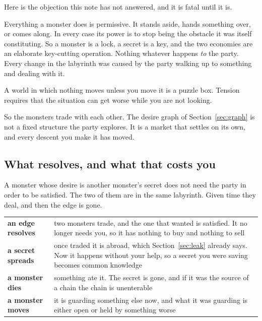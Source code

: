 \documentclass[11pt,a4paper]{article}
\begin{document}
Here is the objection this note has not answered, and it is fatal until it is.

Everything a monster does is permissive. It stands aside, hands something over, or comes along. In
every case its power is to stop being the obstacle it was itself constituting. So a monster is a
lock, a secret is a key, and the two economies are an elaborate key-cutting operation. Nothing
whatever happens \emph{to} the party. Every change in the labyrinth was caused by the party
walking up to something and dealing with it.

A world in which nothing moves unless you move it is a puzzle box. Tension requires that the
situation can get worse while you are not looking.

\begin{sectionbox}
So the monsters trade with each other. The desire graph of Section~\ref{sec:graph} is not a fixed
structure the party explores. It is a market that settles on its own, and every descent you make it
has moved.
\end{sectionbox}

\subsection{What resolves, and what that costs you}

A monster whose desire is another monster's secret does not need the party in order to be
satisfied. The two of them are in the same labyrinth. Given time they deal, and then the edge is
gone.

\begin{center}
\begin{tabular}{@{}l@{\hspace{4mm}}>{\raggedright\arraybackslash}p{}@{}}
\toprule
\textbf{an edge resolves} & two monsters trade, and the one that wanted is satisfied. It no longer
needs you, so it has nothing to buy and nothing to sell \\[1mm]
\textbf{a secret spreads} & once traded it is abroad, which Section~\ref{sec:leak} already says.
Now it happens without your help, so a secret you were saving becomes common knowledge \\[1mm]
\textbf{a monster dies}   & something ate it. The secret is gone, and if it was the source of a
chain the chain is unenterable \\[1mm]
\textbf{a monster moves}  & it is guarding something else now, and what it was guarding is either
open or held by something worse \\
\bottomrule
\end{tabular}
\end{center}
\end{document}
